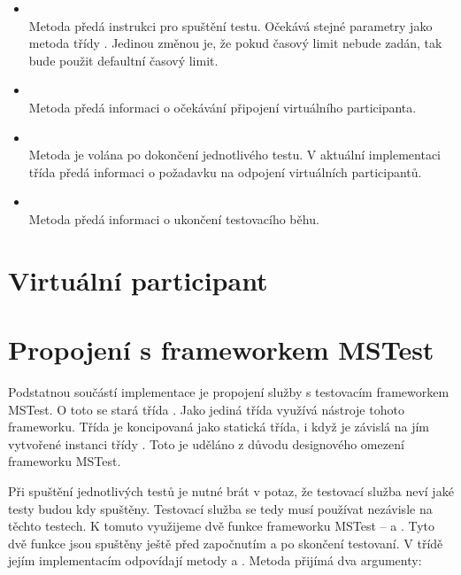 \begin{itemize}
    \item {} \\ Metoda předá instrukci pro spuštění testu. Očekává stejné parametry jako metoda  třídy . Jedinou změnou je, že pokud časový limit nebude zadán, tak bude použit defaultní časový limit.
    \item {} \\ Metoda předá informaci o očekávání připojení virtuálního participanta.
    \item {} \\ Metoda je volána po dokončení jednotlivého testu. V aktuální implementaci třída předá informaci o požadavku na odpojení virtuálních participantů.
    \item {} \\ Metoda předá informaci o ukončení testovacího běhu.
\end{itemize}


\section{Virtuální participant}



\section{Propojení s frameworkem MSTest}

Podstatnou součástí implementace je propojení služby s testovacím frameworkem MSTest. O toto se stará třída . Jako jediná třída využívá nástroje tohoto frameworku. Třída je koncipovaná jako statická třída, i když je závislá na jím vytvořené instanci třídy . Toto je uděláno z důvodu designového omezení frameworku MSTest. 

Při spuštění jednotlivých testů je nutné brát v potaz, že testovací služba neví jaké testy budou kdy spuštěny. Testovací služba se tedy musí používat nezávisle na těchto testech. K tomuto využijeme dvě funkce frameworku MSTest --  a . Tyto dvě funkce jsou spuštěny ještě před započnutím a po skončení testovaní. V třídě  jejím implementacím odpovídají metody  a . Metoda  přijímá dva argumenty:

